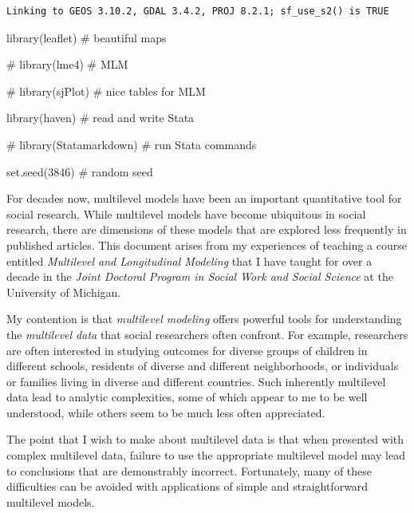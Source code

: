 \documentclass[
  letterpaper,
  DIV=11,
  numbers=noendperiod]{scrreprt}
\newenvironment{Shaded}{\begin{snugshade}}{\end{snugshade}}
\newcommand{\CommentTok}[1]{\textcolor[rgb]{0.37,0.37,0.37}{#1}}
\newcommand{\DecValTok}[1]{\textcolor[rgb]{0.68,0.00,0.00}{#1}}
\newcommand{\FunctionTok}[1]{\textcolor[rgb]{0.28,0.35,0.67}{#1}}
\newcommand{\NormalTok}[1]{\textcolor[rgb]{0.00,0.23,0.31}{#1}}
\begin{document}
\begin{verbatim}
Linking to GEOS 3.10.2, GDAL 3.4.2, PROJ 8.2.1; sf_use_s2() is TRUE
\end{verbatim}

\begin{Shaded}
\begin{Highlighting}[]
\FunctionTok{library}\NormalTok{(leaflet) }\CommentTok{\# beautiful maps}

\CommentTok{\# library(lme4) \# MLM}

\CommentTok{\# library(sjPlot) \# nice tables for MLM}

\FunctionTok{library}\NormalTok{(haven) }\CommentTok{\# read and write Stata}

\CommentTok{\# library(Statamarkdown) \# run Stata commands}

\FunctionTok{set.seed}\NormalTok{(}\DecValTok{3846}\NormalTok{) }\CommentTok{\# random seed}
\end{Highlighting}
\end{Shaded}

For decades now, multilevel models have been an important quantitative
tool for social research. While multilevel models have become ubiquitous
in social research, there are dimensions of these models that are
explored less frequently in published articles. This document arises
from my experiences of teaching a course entitled \emph{Multilevel and
Longitudinal Modeling} that I have taught for over a decade in the
\emph{Joint Doctoral Program in Social Work and Social Science} at the
University of Michigan.

My contention is that \emph{multilevel modeling} offers powerful tools
for understanding the \emph{multilevel data} that social researchers
often confront. For example, researchers are often interested in
studying outcomes for diverse groups of children in different schools,
residents of diverse and different neighborhoods, or individuals or
families living in diverse and different countries. Such inherently
multilevel data lead to analytic complexities, some of which appear to
me to be well understood, while others seem to be much less often
appreciated.

The point that I wish to make about multilevel data is that when
presented with complex multilevel data, failure to use the appropriate
multilevel model may lead to conclusions that are demonstrably
incorrect. Fortunately, many of these difficulties can be avoided with
applications of simple and straightforward multilevel models.
\end{document}
